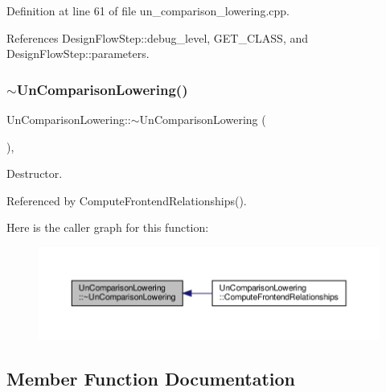 Definition at line 61 of file un\+\_\+comparison\+\_\+lowering.\+cpp.



References Design\+Flow\+Step\+::debug\+\_\+level, G\+E\+T\+\_\+\+C\+L\+A\+SS, and Design\+Flow\+Step\+::parameters.

\mbox{\label{classUnComparisonLowering_a656e59fbe96fd58c9e7f2dbd7c9852fa}} 
\subsubsection{\texorpdfstring{$\sim$\+Un\+Comparison\+Lowering()}{~UnComparisonLowering()}}
{\footnotesize\ttfamily Un\+Comparison\+Lowering\+::$\sim$\+Un\+Comparison\+Lowering (\begin{DoxyParamCaption}{ }\end{DoxyParamCaption})\hspace{0.3cm}{\ttfamily [override]}, {\ttfamily [default]}}



Destructor. 



Referenced by Compute\+Frontend\+Relationships().

Here is the caller graph for this function\+:
\nopagebreak
\begin{figure}[H]
\begin{center}
\leavevmode
\includegraphics[width=350pt]{dc/d54/classUnComparisonLowering_a656e59fbe96fd58c9e7f2dbd7c9852fa_icgraph}
\end{center}
\end{figure}


\subsection{Member Function Documentation}
\mbox{\label{classUnComparisonLowering_ad1d8d14acb85fe2a1e12ccfff206af8e}} 
